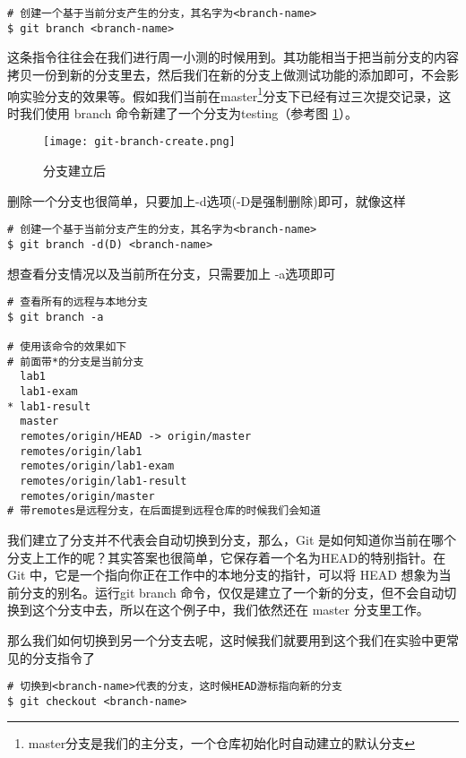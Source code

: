 \begin{verbatim}
# 创建一个基于当前分支产生的分支，其名字为<branch-name>
$ git branch <branch-name>
\end{verbatim}

这条指令往往会在我们进行周一小测的时候用到。其功能相当于把当前分支的内容拷贝一份到新的分支里去，然后我们在新的分支上做测试功能的添加即可，不会影响实验分支的效果等。假如我们当前在master\footnote{master分支是我们的主分支，一个仓库初始化时自动建立的默认分支}分支下已经有过三次提交记录，这时我们使用 branch 命令新建了一个分支为testing（参考图 \ref{git-branch-create.png}）。

\begin{figure}[htbp]
  \centering
  \texttt{[image: git-branch-create.png]}
  \caption{分支建立后}\label{git-branch-create.png}
\end{figure}

删除一个分支也很简单，只要加上-d选项(-D是强制删除)即可，就像这样

\begin{verbatim}
# 创建一个基于当前分支产生的分支，其名字为<branch-name>
$ git branch -d(D) <branch-name>
\end{verbatim}

想查看分支情况以及当前所在分支，只需要加上 -a选项即可

\begin{verbatim}
# 查看所有的远程与本地分支
$ git branch -a

# 使用该命令的效果如下
# 前面带*的分支是当前分支
  lab1
  lab1-exam
* lab1-result
  master
  remotes/origin/HEAD -> origin/master
  remotes/origin/lab1
  remotes/origin/lab1-exam
  remotes/origin/lab1-result
  remotes/origin/master
# 带remotes是远程分支，在后面提到远程仓库的时候我们会知道
\end{verbatim}

我们建立了分支并不代表会自动切换到分支，那么，Git 是如何知道你当前在哪个分支上工作的呢？其实答案也很简单，它保存着一个名为HEAD的特别指针。在 Git 中，它是一个指向你正在工作中的本地分支的指针，可以将 HEAD 想象为当前分支的别名。运行git branch 命令，仅仅是建立了一个新的分支，但不会自动切换到这个分支中去，所以在这个例子中，我们依然还在 master 分支里工作。

那么我们如何切换到另一个分支去呢，这时候我们就要用到这个我们在实验中更常见的分支指令了\label{git checkout}
\begin{verbatim}
# 切换到<branch-name>代表的分支，这时候HEAD游标指向新的分支
$ git checkout <branch-name>
\end{verbatim}

